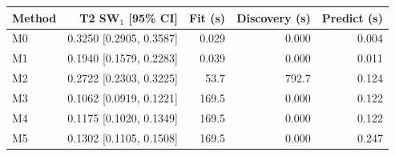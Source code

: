 \begin{tabular}{lrrrr}
\hline
Method & T2 SW$_1$ [95\% CI] & Fit (s) & Discovery (s) & Predict (s) \\
\hline
M0 & 0.3250 [0.2905, 0.3587] & 0.029 & 0.000 & 0.004 \\
M1 & 0.1940 [0.1579, 0.2283] & 0.039 & 0.000 & 0.011 \\
M2 & 0.2722 [0.2303, 0.3225] & 53.7 & 792.7 & 0.124 \\
M3 & 0.1062 [0.0919, 0.1221] & 169.5 & 0.000 & 0.122 \\
M4 & 0.1175 [0.1020, 0.1349] & 169.5 & 0.000 & 0.122 \\
M5 & 0.1302 [0.1105, 0.1508] & 169.5 & 0.000 & 0.247 \\
\hline
\end{tabular}
